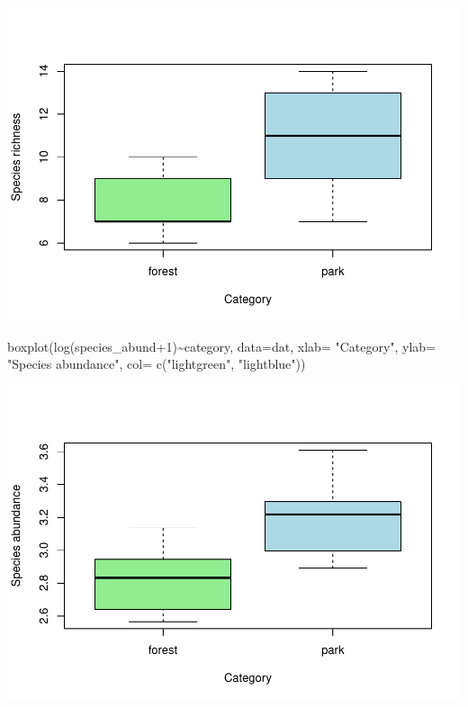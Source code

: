 \documentclass[
]{article}
\newenvironment{Shaded}{\begin{snugshade}}{\end{snugshade}}
\newcommand{\AttributeTok}[1]{\textcolor[rgb]{0.77,0.63,0.00}{#1}}
\newcommand{\DecValTok}[1]{\textcolor[rgb]{0.00,0.00,0.81}{#1}}
\newcommand{\FunctionTok}[1]{\textcolor[rgb]{0.00,0.00,0.00}{#1}}
\newcommand{\NormalTok}[1]{#1}
\newcommand{\SpecialCharTok}[1]{\textcolor[rgb]{0.00,0.00,0.00}{#1}}
\newcommand{\StringTok}[1]{\textcolor[rgb]{0.31,0.60,0.02}{#1}}
\begin{document}
\includegraphics{birdsdataanalysis_files/figure-latex/unnamed-chunk-6-4.pdf}

\begin{Shaded}
\begin{Highlighting}[]
\FunctionTok{boxplot}\NormalTok{(}\FunctionTok{log}\NormalTok{(species\_abund}\SpecialCharTok{+}\DecValTok{1}\NormalTok{)}\SpecialCharTok{\textasciitilde{}}\NormalTok{category, }\AttributeTok{data=}\NormalTok{dat, }\AttributeTok{xlab=} \StringTok{"Category"}\NormalTok{, }\AttributeTok{ylab=} \StringTok{"Species abundance"}\NormalTok{, }\AttributeTok{col=} \FunctionTok{c}\NormalTok{(}\StringTok{"lightgreen"}\NormalTok{, }\StringTok{"lightblue"}\NormalTok{))}
\end{Highlighting}
\end{Shaded}

\includegraphics{birdsdataanalysis_files/figure-latex/unnamed-chunk-6-5.pdf}
\end{document}
